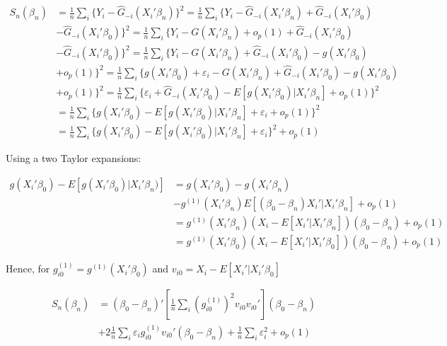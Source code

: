 \documentclass[a4paper]{article}
\begin{document}
\begin{align*}
S_{n}(\beta_n) & = \frac{1}{n}\sum_i \{ Y_i - \hat{G}_{-i}(X_i'\beta_n)\}^2 = \frac{1}{n}\sum_i\{Y_i - \hat{G}_{-i}(X_i'\beta_n) +  \hat{G}_{-i}(X_i'\beta_0) \\
			   & - \hat{G}_{-i}(X_i'\beta_0) \}^2 = \frac{1}{n} \sum_i \{Y_i - G(X_i'\beta_n) + o_p(1) + \hat{G}_{-i}(X_i'\beta_0) \\
			   & - \hat{G}_{-i}(X_i'\beta_0) \}^2 = \frac{1}{n}\sum_i \{ Y_i - G(X_i'\beta_n) + \hat{G}_{-i}(X_i'\beta_0) - g(X_i'\beta_0) \\
			   &  + o_p(1) \}^2 = \frac{1}{n} \sum_i \{ g(X_i'\beta_0) + \varepsilon_i - G(X_i'\beta_n) + \hat{G}_{-i}(X_i'\beta_0) - g(X_i'\beta_0)\\
			   & + o_p(1) \}^2 = \frac{1}{n} \sum_i \{ \varepsilon_i + \hat{G}_{-i}(X_i'\beta_0) - E[g(X_i'\beta_0)|X_i'\beta_n]  + o_p(1) \}^2 \\
			   &= \frac{1}{n}\sum_i \{ g(X_i'\beta_0) - E[g(X_i'\beta_0)|X_i'\beta_n] +  \varepsilon_i + o_p(1)\}^2 \\
			 & = \frac{1}{n}\sum_i \{ g(X_i'\beta_0) - E[g(X_i'\beta_0)|X_i'\beta_n] +  \varepsilon_i\}^2 + o_p(1)
\end{align*}

Using a two Taylor expansions:

\begin{align*}
g(X_i'\beta_0) - E[g(X_i'\beta_0)|X_i'\beta_n)] & = g(X_i'\beta_0) - g(X_i'\beta_n) \\
											 & - g^{(1)}(X_i'\beta_n)E[(\beta_0 - \beta_n)X_i'|X_i'\beta_n] + o_p(1) \\
				                              & = g^{(1)}(X_i'\beta_n)( X_i - E[X_i'|X_i'\beta_n])(\beta_0 - \beta_n) + o_p(1) \\
				                              & = g^{(1)}(X_i'\beta_0)( X_i - E[X_i'|X_i'\beta_0])(\beta_0 - \beta_n) + o_p(1)
\end{align*}


Hence, for $g_{i0}^{(1)} = g^{(1)}(X_i'\beta_0)$ and $v_{i0} = X_i - E[X_i'|X_i'\beta_0]$
 
\begin{align*}
S_{n}(\beta_n) & = (\beta_0 - \beta_n)'\left[\frac{1}{n}\sum_i (g_{i0}^{(1)})^2v_{i0}v_{i0}'\right](\beta_0 - \beta_n) \\
             & + 2\frac{1}{n}\sum_i\varepsilon_ig_{i0}^{(1)}v_{i0}'(\beta_0 - \beta_n) + \frac{1}{n}\sum_i \varepsilon_i^2 + o_p(1)
\end{align*}
\end{document}

